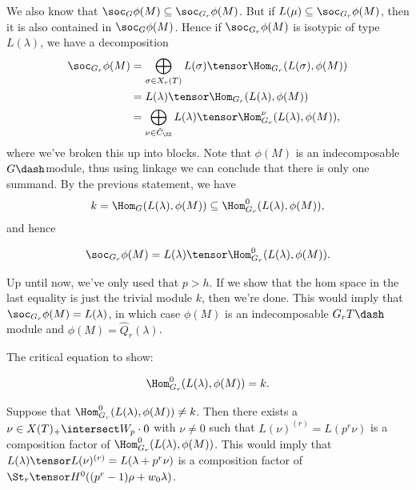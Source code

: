 We also know that \(\soc_G \phi(M) \subseteq \soc_{G_r} \phi(M)\). But
if \(L(\mu) \subseteq \soc_{G_r} \phi(M)\), then it is also contained in
\(\soc_G \phi(M)\). Hence if \(\soc_{G_r}\phi(M)\) is isotypic of type
\(L(\lambda)\), we have a decomposition
\begin{align*}  
\soc_{G_r}\phi(M) 
&= \bigoplus_{\sigma\in X_r(T)} L(\sigma) \tensor \Hom_{G_r}(L(\sigma), \phi(M)) \\
&= L(\lambda) \tensor \Hom_{G_r}(L(\lambda), \phi(M)) \\
&= \bigoplus_{\nu\in \bar{C}_\ZZ} L(\lambda) \tensor \Hom_{G_r}^\nu (L(\lambda), \phi(M))
,\end{align*} where we've broken this up into blocks. Note that
\(\phi(M)\) is an indecomposable \(G\dash\)module, thus using linkage we
can conclude that there is only one summand. By the previous statement,
we have
\begin{align*}  
k = \Hom_{G}(L(\lambda), \phi(M))
 \subseteq \Hom_{G_r}^0 (L(\lambda), \phi(M))
,\end{align*} and hence

\begin{equation}
\soc_{G_r} \phi(M) = L(\lambda) \tensor \Hom_{G_r}^0 (L(\lambda), \phi(M))
.\end{equation}

\begin{remark}

Up until now, we've only used that \(p>h\). If we show that the hom
space in the last equality is just the trivial module \(k\), then we're
done. This would imply that \(\soc_{G_r} \phi(M) = L(\lambda)\), in
which case \(\phi(M)\) is an indecomposable \(G_r T\dash\)module and
\(\phi(M) = \hat{Q}_r(\lambda)\).

\end{remark}

The critical equation to show:

\begin{equation}
\Hom_{G_r}^0 (L(\lambda), \phi(M)) = k
.\end{equation}

Suppose that \(\Hom_{G_r}^0 (L(\lambda), \phi(M)) \neq k\). Then there
exists a \(\nu\in X(T)_+ \intersect W_p \cdot 0\) with \(\nu\neq 0\)
such that \(L(\nu)^{(r)} = L(p^r \nu)\) is a composition factor of
\(\Hom_{G_r}^0 (L(\lambda), \phi(M))\). This would imply that
\(L(\lambda) \tensor L(\nu)^{(r)} = L(\lambda+ p^r\nu)\) is a
composition factor of \(\St_r \tensor H^0( (p^r-1)\rho + w_0 \lambda)\).

